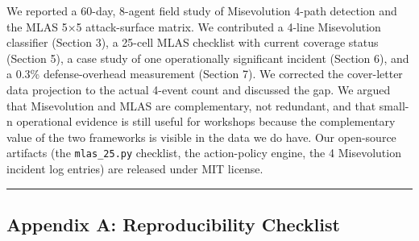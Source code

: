 We reported a 60-day, 8-agent field study of Misevolution 4-path
detection and the MLAS 5×5 attack-surface matrix. We contributed a
4-line Misevolution classifier (Section 3), a 25-cell MLAS checklist
with current coverage status (Section 5), a case study of one
operationally significant incident (Section 6), and a 0.3\%
defense-overhead measurement (Section 7). We corrected the cover-letter
data projection to the actual 4-event count and discussed the gap. We
argued that Misevolution and MLAS are complementary, not redundant, and
that small-n operational evidence is still useful for workshops because
the complementary value of the two frameworks is visible in the data we
do have. Our open-source artifacts (the \texttt{mlas\_25.py} checklist,
the action-policy engine, the 4 Misevolution incident log entries) are
released under MIT license.

\begin{center}\rule{0.5\linewidth}{0.5pt}\end{center}

\subsection{Appendix A: Reproducibility
Checklist}\label{appendix-a-reproducibility-checklist}

